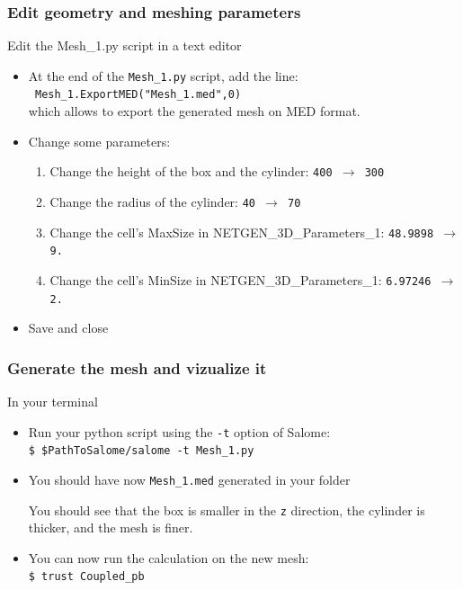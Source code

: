 \documentclass[10pt, hyperref={unicode=true,pdfusetitle, bookmarks=true,bookmarksnumbered=false,bookmarksopen=false, breaklinks=false,pdfborder={0 0l 1},backref=true,colorlinks=true,linkcolor=darkblue,pageanchor}]{beamer}
\begin{document}
\begin{frame}
\frametitle{Edit geometry and meshing parameters}

\begin{block}{Edit the Mesh\_1.py script in a text editor}
\begin{itemize}
 \item At the end of the \texttt{Mesh\_1.py} script, add the line:\\
 \texttt{   Mesh\_1.ExportMED("Mesh\_1.med",0)}\\
which allows to export the generated mesh on MED format.
 \item Change some parameters:
 \begin{enumerate}
  \item Change the height of the box and the cylinder: \texttt{400 $\rightarrow$ 300}

  \item Change the radius of the cylinder: \texttt{40 $\rightarrow$ 70}

  \item Change the cell's MaxSize in NETGEN\_3D\_Parameters\_1: \texttt{48.9898 $\rightarrow$ 9.}

  \item Change the cell's MinSize in NETGEN\_3D\_Parameters\_1: \texttt{6.97246 $\rightarrow$ 2.}

 \end{enumerate}

 \item Save and close\\
\end{itemize}
\end{block}

\end{frame}
\begin{frame}
\frametitle{Generate the mesh and vizualize it}

\begin{block}{In your terminal}
\begin{itemize}
 \item Run your python script using the \texttt{-t} option of Salome:\\
 \texttt{\$ \$PathToSalome/salome -t Mesh\_1.py}

 \item You should have now \texttt{Mesh\_1.med}  generated in your folder

 You should see that the box is smaller in the \texttt{z} direction, the cylinder is thicker, and the mesh is finer.

 \item You can now run the calculation on the new mesh:\\
 \texttt{\$ trust Coupled\_pb}
\end{itemize}
\end{block}

\end{frame}
\end{document}
